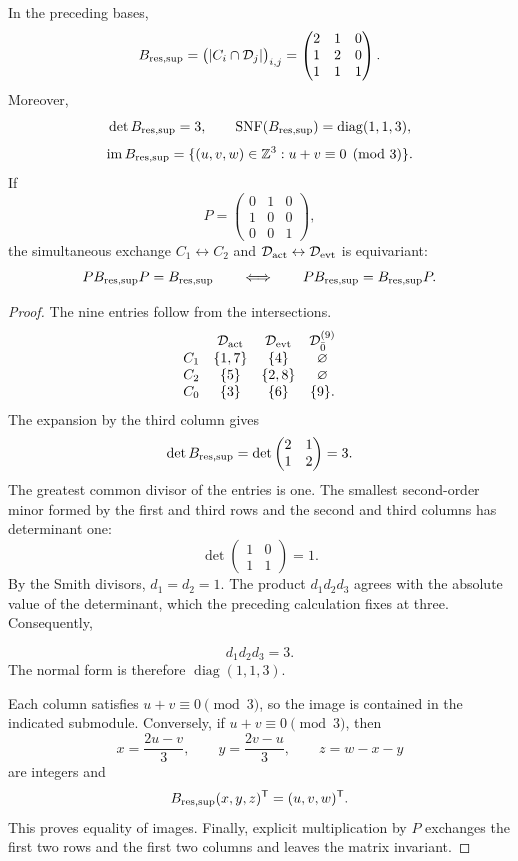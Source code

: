 \begin{theorem}
\label{thm:incidencia-residuo-soporte}
In the preceding bases,
\[
 B_{\rm res,sup}
 =\bigl(|C_i\cap\mathcal D_j|\bigr)_{i,j}
 =
 \begin{pmatrix}
 2&1&0\\
 1&2&0\\
 1&1&1
 \end{pmatrix}.
\]
Moreover,
\[
 \det B_{\rm res,sup}=3,\qquad
 \operatorname{SNF}(B_{\rm res,sup})
 =\operatorname{diag}(1,1,3),
\]
\[
 \operatorname{im}B_{\rm res,sup}
 =\{(u,v,w)\in\mathbb Z^3:u+v\equiv0\pmod3\}.
\]
If
\[
 P=\begin{pmatrix}0&1&0\\1&0&0\\0&0&1\end{pmatrix},
\]
the simultaneous exchange
\(C_1\leftrightarrow C_2\) and
\(\mathcal D_{\rm act}\leftrightarrow\mathcal D_{\rm evt}\) is equivariant:
\[
 P B_{\rm res,sup}P=B_{\rm res,sup}
 \qquad\Longleftrightarrow\qquad
 PB_{\rm res,sup}=B_{\rm res,sup}P.
\]
\end{theorem}

\begin{proof}
The nine entries follow from the intersections.
\[
\begin{array}{cccc}
 &\mathcal D_{\rm act}&\mathcal D_{\rm evt}
 &\mathcal D_{\bar0}^{(9)}\\
 C_1&\{1,7\}&\{4\}&\varnothing\\
 C_2&\{5\}&\{2,8\}&\varnothing\\
 C_0&\{3\}&\{6\}&\{9\}.
\end{array}
\]
The expansion by the third column gives
\[
 \det B_{\rm res,sup}
 =\det\begin{pmatrix}2&1\\1&2\end{pmatrix}=3.
\]
The greatest common divisor of the entries is one. The smallest second-order
minor formed by the first and third rows and the second and third columns
has determinant one:
\[
 \det\begin{pmatrix}1&0\\1&1\end{pmatrix}=1.
\]
By the Smith divisors, \(d_1=d_2=1\). The product
\(d_1d_2d_3\) agrees with the absolute value of the determinant, which the
preceding calculation fixes at three. Consequently,

\[
 d_1d_2d_3=3.
\]
The normal form is therefore \(\operatorname{diag}(1,1,3)\).

Each column satisfies \(u+v\equiv0\pmod3\), so the image is contained
in the indicated submodule. Conversely, if \(u+v\equiv0\pmod3\), then
\[
 x=\frac{2u-v}{3},\qquad
 y=\frac{2v-u}{3},\qquad
 z=w-x-y
\]
are integers and
\[
 B_{\rm res,sup}(x,y,z)^{\mathsf T}=(u,v,w)^{\mathsf T}.
\]
This proves equality of images. Finally, explicit multiplication
by \(P\) exchanges the first two rows and the first two columns and
leaves the matrix invariant.
\end{proof}

